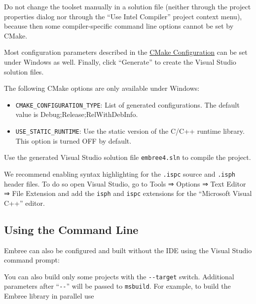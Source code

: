 Do not change the toolset manually in a solution file (neither through
the project properties dialog nor through the ``Use Intel Compiler''
project context menu), because then some compiler-specific command line
options cannot be set by CMake.

Most configuration parameters described in the
\hyperref[cmake-configuration]{CMake Configuration} can be set under
Windows as well. Finally, click ``Generate'' to create the Visual Studio
solution files.

The following CMake options are only available under Windows:

\begin{itemize}
\item
  \texttt{CMAKE\_CONFIGURATION\_TYPE}: List of generated configurations.
  The default value is Debug;Release;RelWithDebInfo.
\item
  \texttt{USE\_STATIC\_RUNTIME}: Use the static version of the C/C++
  runtime library. This option is turned OFF by default.
\end{itemize}

Use the generated Visual Studio solution file \texttt{embree4.sln} to
compile the project.

We recommend enabling syntax highlighting for the \texttt{.ispc} source
and \texttt{.isph} header files. To do so open Visual Studio, go to
Tools ⇒ Options ⇒ Text Editor ⇒ File Extension and add the \texttt{isph}
and \texttt{ispc} extensions for the ``Microsoft Visual C++'' editor.

\subsection{Using the Command Line}\label{using-the-command-line}

Embree can also be configured and built without the IDE using the Visual
Studio command prompt:

\begin{Shaded}
\begin{Highlighting}[]
\OperatorTok{{-}} 
\OperatorTok{{-}{-}} \OperatorTok{{-}{-}}
\end{Highlighting}
\end{Shaded}

You can also build only some projects with the \texttt{-\/-target}
switch. Additional parameters after ``\texttt{-\/-}'' will be passed to
\texttt{msbuild}. For example, to build the Embree library in parallel
use


